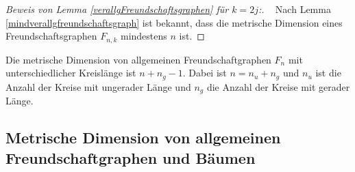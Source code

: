 \begin{proof}[Beweis von Lemma \ref{verallgFreundschaftsgraphen} für $k=2j$:] \vspace{+1mm} ~ \linebreak 
Nach Lemma \ref{mindverallgfreundschaftsgraph} ist bekannt, dass die metrische Dimension eines Freundschaftsgraphen $F_{n,k}$ mindestens $n$ ist. 
\end{proof}
\begin{lem}
Die metrische Dimension von allgemeinen Freundschaftgraphen $F_{n}$ mit unterschiedlicher Kreislänge ist $n+n_g-1$. Dabei ist $n=n_u+n_g$ und $n_u$ ist die Anzahl der Kreise mit ungerader Länge und $n_g$ die Anzahl der Kreise mit gerader Länge.
\end{lem}
\subsection{Metrische Dimension von allgemeinen Freundschaftgraphen und Bäumen}
\newpage
